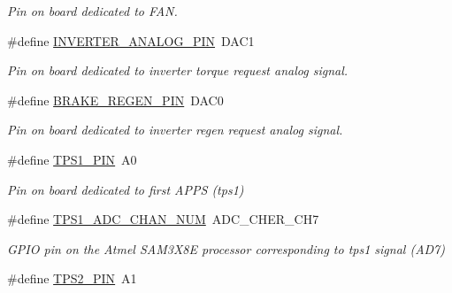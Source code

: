 \begin{DoxyCompactItemize}
\begin{DoxyCompactList}\small\item\em Pin on board dedicated to F\-A\-N. \end{DoxyCompactList}\item 
\hypertarget{group___board__model__group_gad6c9e9b63f53c664772ee858436e0ae9}{\#define \hyperlink{group___board__model__group_gad6c9e9b63f53c664772ee858436e0ae9}{I\-N\-V\-E\-R\-T\-E\-R\-\_\-\-A\-N\-A\-L\-O\-G\-\_\-\-P\-I\-N}~D\-A\-C1}\label{group___board__model__group_gad6c9e9b63f53c664772ee858436e0ae9}

\begin{DoxyCompactList}\small\item\em Pin on board dedicated to inverter torque request analog signal. \end{DoxyCompactList}\item 
\hypertarget{group___board__model__group_ga604c7f4c9fe74f1d9877071bbee1c9e0}{\#define \hyperlink{group___board__model__group_ga604c7f4c9fe74f1d9877071bbee1c9e0}{B\-R\-A\-K\-E\-\_\-\-R\-E\-G\-E\-N\-\_\-\-P\-I\-N}~D\-A\-C0}\label{group___board__model__group_ga604c7f4c9fe74f1d9877071bbee1c9e0}

\begin{DoxyCompactList}\small\item\em Pin on board dedicated to inverter regen request analog signal. \end{DoxyCompactList}\item 
\hypertarget{group___board__model__group_gae9aa914854f611488701c96a330b0bd4}{\#define \hyperlink{group___board__model__group_gae9aa914854f611488701c96a330b0bd4}{T\-P\-S1\-\_\-\-P\-I\-N}~A0}\label{group___board__model__group_gae9aa914854f611488701c96a330b0bd4}

\begin{DoxyCompactList}\small\item\em Pin on board dedicated to first A\-P\-P\-S (tps1) \end{DoxyCompactList}\item 
\hypertarget{group___board__model__group_ga99b2a7dadaf495e3c559a46440f9141f}{\#define \hyperlink{group___board__model__group_ga99b2a7dadaf495e3c559a46440f9141f}{T\-P\-S1\-\_\-\-A\-D\-C\-\_\-\-C\-H\-A\-N\-\_\-\-N\-U\-M}~A\-D\-C\-\_\-\-C\-H\-E\-R\-\_\-\-C\-H7}\label{group___board__model__group_ga99b2a7dadaf495e3c559a46440f9141f}

\begin{DoxyCompactList}\small\item\em G\-P\-I\-O pin on the Atmel S\-A\-M3\-X8\-E processor corresponding to tps1 signal (A\-D7) \end{DoxyCompactList}\item 
\hypertarget{group___board__model__group_gab13a816bae3ca994897fc6f1cb590a67}{\#define \hyperlink{group___board__model__group_gab13a816bae3ca994897fc6f1cb590a67}{T\-P\-S2\-\_\-\-P\-I\-N}~A1}\label{group___board__model__group_gab13a816bae3ca994897fc6f1cb590a67}


\end{DoxyCompactItemize}
